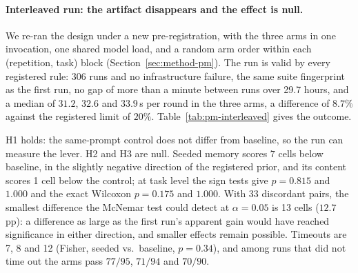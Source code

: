 \documentclass[smallcondensed,natbib]{svjour3}
\begin{document}
\paragraph{Interleaved run: the artifact disappears and the effect is
null.} We re-ran the design under a new pre-registration, with the
three arms in one invocation, one shared model load, and a random arm
order within each (repetition, task) block
(Section~\ref{sec:method-pm}). The run is valid by every registered
rule: 306 runs and no infrastructure failure, the same suite
fingerprint as the first run, no gap of more than a minute between
runs over 29.7 hours, and a median of $31.2$, $32.6$ and $33.9$\,s per
round in the three arms, a difference of $8.7\%$ against the
registered limit of $20\%$. Table~\ref{tab:pm-interleaved} gives the
outcome.

\begin{table}
\caption{Study 2, interleaved run (pre-registered 2026-11-17, amendment
1): the same design as Table~\ref{tab:pm}, with the arms in one
invocation and a random arm order within each (repetition, task)
block. The harness commit is later than the first run's, so absolute
pass rates are not comparable across the two runs; the contrasts are
read within each run. Holm across the two contrasts against baseline.}
\label{tab:pm-interleaved}
\end{table}

H1 holds: the same-prompt control does not differ from baseline, so
the run can measure the lever. H2 and H3 are null. Seeded memory
scores $7$ cells below baseline, in the slightly negative direction of
the registered prior, and its content scores 1 cell below the
control; at task level the sign tests give $p=0.815$ and $1.000$ and
the exact Wilcoxon $p=0.175$ and $1.000$. With 33 discordant pairs, the
smallest difference the McNemar test could detect at $\alpha=0.05$ is
13 cells ($12.7$\,pp): a difference as large as the first run's
apparent gain would have reached significance in either direction, and
smaller effects remain possible. Timeouts are 7, 8 and 12 (Fisher, seeded vs.\
baseline, $p=0.34$), and among runs that did not time out the arms
pass $77/95$, $71/94$ and $70/90$.
\end{document}
